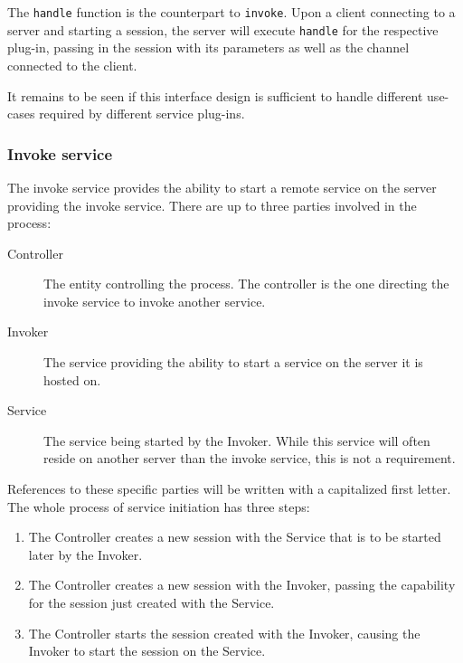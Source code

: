 The \lstinline{handle} function is the counterpart to \lstinline{invoke}.
Upon a client connecting to a server and starting a session, the server will execute \lstinline{handle} for the respective plug-in, passing in the session with its parameters as well as the channel connected to the client.

It remains to be seen if this interface design is sufficient to handle different use-cases required by different service plug-ins.

\subsubsection{Invoke service}
\label{sec:invoke-service}

The invoke service provides the ability to start a remote service on the server providing the invoke service.
There are up to three parties involved in the process:
\begin{description}
    \item[Controller]
        The entity controlling the process.
        The controller is the one directing the invoke service to invoke another service.
    \item[Invoker]
        The service providing the ability to start a service on the server it is hosted on.
    \item[Service]
        The service being started by the Invoker.
        While this service will often reside on another server than the invoke service, this is not a requirement.
\end{description}

References to these specific parties will be written with a capitalized first letter.
The whole process of service initiation has three steps:
\begin{enumerate}
    \item The Controller creates a new session with the Service that is to be started later by the Invoker.
    \item The Controller creates a new session with the Invoker, passing the capability for the session just created with the Service.
    \item The Controller starts the session created with the Invoker, causing the Invoker to start the session on the Service.
\end{enumerate}

